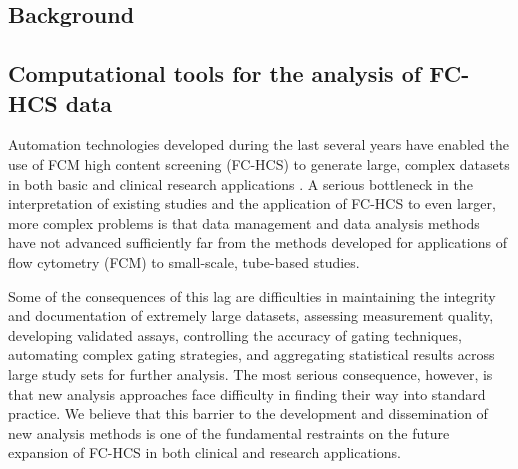 \documentclass[10pt]{bmc_article}
\newenvironment{bmcformat}{\begin{raggedright}\baselineskip20pt\sloppy\setboolean{publ}{false}}{\end{raggedright}\baselineskip20pt\sloppy}
\begin{document}
\begin{bmcformat}








\section*{Background}
 \subsection*{Computational tools for the analysis of FC-HCS data}
Automation technologies developed during the last several years have
enabled the use of FCM high content screening (FC-HCS) to generate
large, complex datasets in both basic and clinical research
applications \citep{brinkman2007hcf}. A serious bottleneck in the
interpretation of existing studies and the application of FC-HCS to
even larger, more complex problems is that data management and data
analysis methods have not advanced sufficiently far from the methods
developed for applications of flow cytometry (FCM) to small-scale,
tube-based studies.

Some of the consequences of this lag are difficulties in maintaining
the integrity and documentation of extremely large datasets, assessing
measurement quality, developing validated assays, controlling the
accuracy of gating techniques, automating complex gating strategies,
and aggregating statistical results across large study sets for
further analysis. The most serious consequence, however, is that new
analysis approaches face difficulty in finding their way into standard
practice. We believe that this barrier to the development and
dissemination of new analysis methods is one of the fundamental
restraints on the future expansion of FC-HCS in both clinical and
research applications.


\end{bmcformat}
\end{document}
